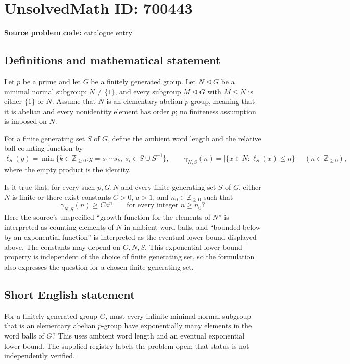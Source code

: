 \documentclass[11pt]{article}
\newcommand{\Z}{\mathbb{Z}}
\begin{document}
\section*{UnsolvedMath ID: 700443}
\textbf{Source problem code:} catalogue entry
\subsection{Definitions and mathematical statement}
Let \(p\) be a prime and let \(G\) be a finitely generated group. Let \(N\trianglelefteq G\) be a minimal normal subgroup: \(N\ne\{1\}\), and every subgroup \(M\trianglelefteq G\) with \(M\le N\) is either \(\{1\}\) or \(N\). Assume that \(N\) is an elementary abelian \(p\)-group, meaning that it is abelian and every nonidentity element has order \(p\); no finiteness assumption is imposed on \(N\).

For a finite generating set \(S\) of \(G\), define the ambient word length and the relative ball-counting function by
\[
\ell_S(g)=\min\{k\in\Z_{\ge0}:g=s_1\cdots s_k,\ s_i\in S\cup S^{-1}\},
\qquad
\gamma_{N,S}(n)=\bigl|\{x\in N:\ell_S(x)\le n\}\bigr|
\quad(n\in\Z_{\ge0}),
\]
where the empty product is the identity.

Is it true that, for every such \(p,G,N\) and every finite generating set \(S\) of \(G\), either \(N\) is finite or there exist constants \(C>0\), \(a>1\), and \(n_0\in\Z_{\ge0}\) such that
\[
\gamma_{N,S}(n)\ge C a^n
\qquad\text{for every integer }n\ge n_0?
\]
Here the source's unspecified ``growth function for the elements of \(N\)'' is interpreted as counting elements of \(N\) in ambient word balls, and ``bounded below by an exponential function'' is interpreted as the eventual lower bound displayed above. The constants may depend on \(G,N,S\). This exponential lower-bound property is independent of the choice of finite generating set, so the formulation also expresses the question for a chosen finite generating set.
\subsection{Short English statement}
For a finitely generated group \(G\), must every infinite minimal normal subgroup that is an elementary abelian \(p\)-group have exponentially many elements in the word balls of \(G\)? This uses ambient word length and an eventual exponential lower bound. The supplied registry labels the problem open; that status is not independently verified.
\end{document}
